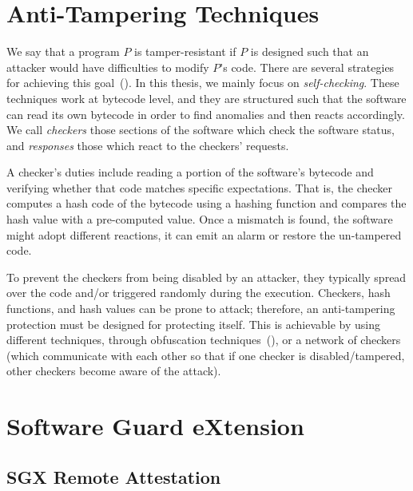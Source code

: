 
\section{Anti-Tampering Techniques}
\label{sec:anti-tampering-techniques}

We say that a program $P$ is tamper-resistant if $P$ is designed such that an 
attacker would have difficulties to modify $P$'s code.
There are several strategies for achieving this 
goal~(\cite{nagra2009surreptitious}).
In this thesis, we mainly focus on \emph{self-checking}.
These techniques work at bytecode level, and they are structured such that the 
software can read its own bytecode in order to find anomalies and then reacts 
accordingly.
We call \emph{checkers} those sections of the software which check the software 
status, and \emph{responses} those which react to the checkers' requests.

A checker's duties include reading a portion of the software's bytecode and 
verifying whether that code matches specific expectations. That is, the checker 
computes a hash code of the bytecode using a hashing function and compares the 
hash value with a pre-computed value. 
Once a mismatch is found, the software might adopt different reactions, \eg it 
can emit an alarm or restore the un-tampered code. 

To prevent the checkers from being disabled by an attacker, they typically 
spread over the code and/or triggered randomly during the execution.
Checkers, hash functions, and hash values can be prone to attack; therefore, an 
anti-tampering protection must be designed for protecting itself.
This is achievable by using different techniques,
\eg through obfuscation techniques~(\cite{banescu2017tutorial}), or a network 
of checkers (which communicate with each other so that if one checker is 
disabled/tampered, other checkers become aware of the attack).

\section{Software Guard eXtension}
\label{sec:software-guard-extension}


\subsection{SGX Remote Attestation}
\label{ssec:sgx-remote-attestation}

